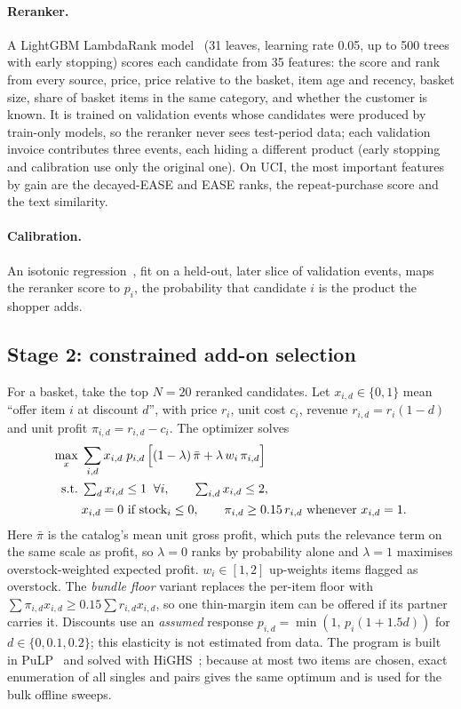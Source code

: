 \documentclass[11pt]{article}
\begin{document}
\paragraph{Reranker.}
A LightGBM LambdaRank model~\citep{ke2017lightgbm,burges2010lambdamart} (31 leaves, learning rate 0.05, up to 500 trees with early stopping) scores each candidate from 35 features: the score and rank from every source, price, price relative to the basket, item age and recency, basket size, share of basket items in the same category, and whether the customer is known.
It is trained on validation events whose candidates were produced by train-only models, so the reranker never sees test-period data; each validation invoice contributes three events, each hiding a different product (early stopping and calibration use only the original one).
On UCI, the most important features by gain are the decayed-EASE and EASE ranks, the repeat-purchase score and the text similarity.

\paragraph{Calibration.}
An isotonic regression~\citep{zadrozny2002calibration}, fit on a held-out, later slice of validation events, maps the reranker score to $p_i$, the probability that candidate $i$ is the product the shopper adds.

\subsection{Stage 2: constrained add-on selection}

For a basket, take the top $N{=}20$ reranked candidates.
Let $x_{i,d}\in\{0,1\}$ mean ``offer item $i$ at discount $d$'', with price $r_i$, unit cost $c_i$, revenue $r_{i,d}=r_i(1-d)$ and unit profit $\pi_{i,d}=r_{i,d}-c_i$.
The optimizer solves
\begin{align}
\max_{x}\;& \sum_{i,d} x_{i,d}\; p_{i,d}\,\Big[(1-\lambda)\,\bar{\pi} + \lambda\, w_i\, \pi_{i,d}\Big] \label{eq:obj}\\
\text{s.t.}\;& \textstyle\sum_d x_{i,d} \le 1 \;\;\forall i, \qquad \sum_{i,d} x_{i,d} \le 2, \notag\\
& x_{i,d}=0 \text{ if stock}_i \le 0, \qquad \pi_{i,d} \ge 0.15\, r_{i,d} \text{ whenever } x_{i,d}=1. \notag
\end{align}
Here $\bar\pi$ is the catalog's mean unit gross profit, which puts the relevance term on the same scale as profit, so $\lambda{=}0$ ranks by probability alone and $\lambda{=}1$ maximises overstock-weighted expected profit.
$w_i\in[1,2]$ up-weights items flagged as overstock.
The \emph{bundle floor} variant replaces the per-item floor with $\sum \pi_{i,d} x_{i,d} \ge 0.15 \sum r_{i,d} x_{i,d}$, so one thin-margin item can be offered if its partner carries it.
Discounts use an \emph{assumed} response $p_{i,d}=\min(1,\,p_i(1+1.5d))$ for $d\in\{0,0.1,0.2\}$; this elasticity is not estimated from data.
The program is built in PuLP~\citep{mitchell2011pulp} and solved with HiGHS~\citep{huangfu2018highs}; because at most two items are chosen, exact enumeration of all singles and pairs gives the same optimum and is used for the bulk offline sweeps.
\end{document}
